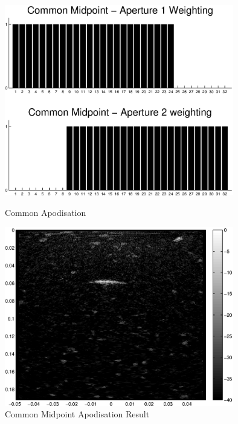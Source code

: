 \begin{figure}[p]
\centering
		\includegraphics[width=100mm]{Common.eps}
		\caption{Common Apodisation}
		\label{fig:apod_com}

		\includegraphics[width=100mm]{SAC_Common.eps}
		\caption{Common Midpoint Apodisation Result}
		\label{fig:apod_com_result}
\end{figure}

